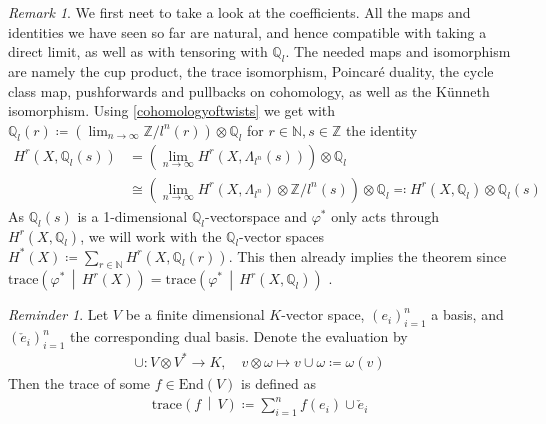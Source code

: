 \documentclass[english]{scrartcl}
\theoremstyle{definition}
\theoremstyle{remark}
\newtheorem{Rem}[Def]{Remark}
\newtheorem{Rev}[Def]{Reminder}
\newcommand*{\N}{\mathds{N}}
\newcommand*{\Z}{\mathds{Z}}
\newcommand*{\Q}{\mathds{Q}}
\newcommand*{\Zmod}[1]{\Z/#1} %
\newcommand*{\Zl}{\Z_l} %
\newcommand*{\Ql}{\Q_l} %
\newcommand*{\End}[1]{\text{End}(#1)} %
\newcommand*{\M}{\Lambda}
\newcommand*{\trace}[2]{{\text{trace}\left(#1 \,\middle|\, #2 \right)}} %
\renewcommand*{\phi}{\varphi}
\newcommand*{\dual}[1]{\check{#1}} %
\begin{document}
\begin{Rem}\label{changeofcoefficients}
  We first neet to take a look at the coefficients.
  All the maps and identities we have seen so far are natural,
  and hence compatible with taking a direct limit,
  as well as with tensoring with $\Ql$.
  The needed maps and isomorphism are namely
  the cup product,
  the trace isomorphism,
  Poincaré duality,
  the cycle class map,
  pushforwards and pullbacks on cohomology, as well as
  the Künneth isomorphism.
  Using  \ref{cohomologyoftwists} we get with
  $\Ql(r)\coloneqq\left(\lim_{n\to\infty}\Zmod{l^n}(r)\right)\otimes\Ql$
  for $r\in\N,s\in\Z$ the identity
  \begin{align*}
    H^r(X,\Ql(s)) &=
    \left(\lim_{n\to\infty} H^r(X,\M_{l^n}(s))\right) \otimes \Ql\\
    &\cong
    \left(\lim_{n\to\infty} H^r(X,\M_{l^n})\otimes \Zmod{l^n}(s)\right)\otimes\Ql
    \eqqcolon H^r(X,\Ql)\otimes\Ql(s)
  \end{align*}
  As $\Ql(s)$ is a 1-dimensional $\Ql$-vectorspace and $\phi^*$ only
  acts through $H^r(X,\Ql)$, we will work with the $\Ql$-vector spaces
  $H^*(X)\coloneqq\sum_{r\in\N} H^r(X, \Ql(r))$. This then
  already implies the theorem
  since $\trace{\phi^*}{H^r(X)}=\trace{\phi^*}{H^r(X,\Ql)}$
  \cite[][Rem.~I.25.5]{milne}.
\end{Rem}

\begin{Rev}
  Let $V$ be a finite dimensional $K$-vector space, $(e_i)_{i=1}^n$ a basis,
  and $(\dual e_i)_{i=1}^n$ the corresponding dual basis.
  Denote the evaluation by
  \begin{align*}
    \cup\colon V\otimes V^* \to K,\quad
    v\otimes \omega \mapsto v\cup\omega\coloneqq \omega(v)
  \end{align*}
  Then the trace of some $f\in\End{V}$ is defined as
  \begin{gather*}
    \trace{f}{V} \coloneqq \sum_{i=1}^n f(e_i)\cup \dual e_i
  \end{gather*}
\end{Rev}
\end{document}
